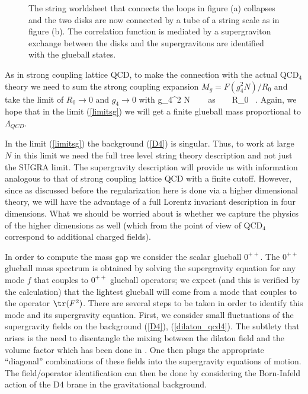 \begin{figure}[htb]
\begin{center}
\epsfxsize=2.8in\leavevmode{}
\end{center}
\caption{The string worldsheet that connects the loops in figure (a)
collapses and 
the two disks are now connected by a tube of a string scale as in figure (b).
The correlation
function is mediated by a supergraviton exchange between the disks
and the  supergravitons are identified with the glueball states.
}
\label{graviton}
\end{figure} 

As in strong coupling lattice QCD,
to make the connection with the actual QCD$_4$ theory we need 
to sum the strong coupling expansion $M_g= F(g_{4}^2 N) / R_0$
and take the limit of $R_0 \to 0$ and $g_4 \to 0$ with
\beq
g_{4}^2 N \rightarrow {}~~~
as~~~~R_0 \ .
\label{limitsg}
\eeq
Again, 
we hope that in the limit (\ref{limitsg}) we will get a finite glueball mass
proportional to $\Lambda_{QCD}$.


In the limit (\ref{limitsg}) the background (\ref{D4}) is singular.
Thus, to work at large $N$ in this limit we need the full
tree level string theory description and not just the SUGRA limit.
The supergravity description will provide us with information analogous
to that of strong coupling lattice QCD with a finite cutoff.
However, since as discussed before
the regularization here is done via a higher dimensional theory,
we will have the advantage of a full Lorentz invariant description
in four dimensions.
What we should be worried about is whether we capture the physics of the
higher dimensions as well (which from the point of view of QCD$_4$ 
correspond to additional charged fields).

In order to compute the mass gap 
we consider the scalar glueball $0^{++}$.
The  $0^{++}$ glueball mass  spectrum is obtained by solving
the supergravity equation for any mode $f$ that couples
to $0^{++}$ glueball operators; we expect (and this is verified by the
calculation) that the lightest glueball will come from a mode that couples
to the operator
$\tr(F^2)$. There are several steps to be taken 
in order to identify this mode and its supergravity equation.
First, we consider small
fluctuations of the supergravity 
fields on the background (\ref{D4}), (\ref{dilaton_qcd4}).
The subtlety that arises is the need to disentangle the 
mixing between the dilaton field and
the volume factor which has been done in \cite{Hashimoto:1998ao}. 
One then plugs the appropriate ``diagonal''
combinations of these fields into the supergravity equations of motion.
The field/operator identification can then be 
done by considering the Born-Infeld action of
the D4 brane in the gravitational background. 

